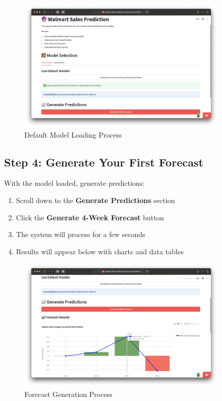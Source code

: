 \begin{figure}[H]
	\centering
	\includegraphics[width=0.9\textwidth]{Images/03FirstStepsGuide/ModelLoading.png}
	\caption{Default Model Loading Process}
	\label{fig:model_loading}
\end{figure}

\subsection{Step 4: Generate Your First Forecast}

With the model loaded, generate predictions:

\begin{enumerate}
	\item Scroll down to the \textbf{Generate Predictions} section
	\item Click the \textbf{Generate 4-Week Forecast} button
	\item The system will process for a few seconds
	\item Results will appear below with charts and data tables
\end{enumerate}

\begin{figure}[H]
	\centering
	\includegraphics[width=0.9\textwidth]{Images/03FirstStepsGuide/GeneratingForecast.png}
	\caption{Forecast Generation Process}
	\label{fig:generating_forecast}
\end{figure}

